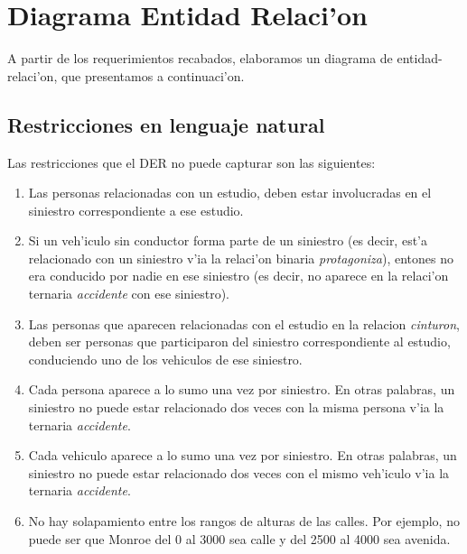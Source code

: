 \section{Diagrama Entidad Relaci'on}

A partir de los requerimientos recabados, elaboramos un diagrama de entidad-relaci'on, que presentamos a continuaci'on.



\subsection{Restricciones en lenguaje natural}

Las restricciones que el DER no puede capturar son las siguientes:

\begin{enumerate}
\item Las personas relacionadas con un estudio, deben estar involucradas en el siniestro correspondiente a ese estudio.

\item Si un veh'iculo sin conductor forma parte de un siniestro (es decir, est'a relacionado con un siniestro v'ia la relaci'on binaria \textit{protagoniza}), entones no era conducido por nadie en ese siniestro (es decir, no aparece en la relaci'on ternaria \textit{accidente} con ese siniestro).

\item Las personas que aparecen relacionadas con el estudio en la relacion \textit{cinturon}, deben ser personas que participaron del siniestro correspondiente al estudio, conduciendo uno de los vehiculos de ese siniestro.

\item Cada persona aparece a lo sumo una vez por siniestro. En otras palabras, un siniestro no puede estar relacionado dos veces con la misma persona v'ia la ternaria \textit{accidente}.

\item Cada vehiculo aparece a lo sumo una vez por siniestro. En otras palabras, un siniestro no puede estar relacionado dos veces con el mismo veh'iculo v'ia la ternaria \textit{accidente}.

\item No hay solapamiento entre los rangos de alturas de las calles. Por ejemplo, no puede ser que Monroe del 0 al 3000 sea calle y del 2500 al 4000 sea avenida.

\end{enumerate}
